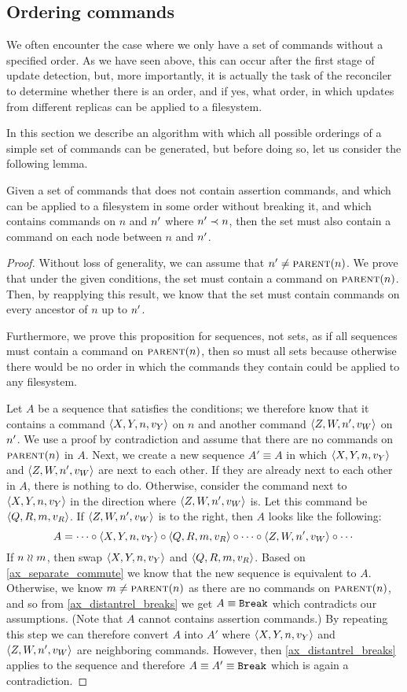 
\subsection{Ordering commands}\label{ordering}

We often encounter the case where we only have a set of commands without a specified order.
As we have seen above, this can occur after the first stage of update detection,
but, more importantly,
it is actually the task of the reconciler to determine whether there is an order,
and if yes, what order,
in which updates from different replicas can be applied to a filesystem.

In this section we describe an algorithm with which all possible orderings of a
simple set of commands can be generated, but before doing so, let us consider the following lemma.

\begin{mylem}\label{connected_changes}
Given a set of commands that
does not contain assertion commands,
and which can be applied to a filesystem in some order without breaking it,
and which contains commands on $n$ and $n'$ where $n'\prec n$,
then the set must also contain a command
on each node between $n$ and $n'$.
\end{mylem}
\begin{proof}
Without loss of generality, we can assume that $n'\neq\text{\normalfont\scshape{parent}}(n)$.
We prove that under the given conditions, the set must contain a command on $\text{\normalfont\scshape{parent}}(n)$.
Then, by reapplying this result, we know that the set must contain commands on every
ancestor of $n$ up to $n'$.

Furthermore,
we prove this proposition for sequences, not sets, as if all sequences must contain a command on $\text{\normalfont\scshape{parent}}(n)$,
then so must all sets because otherwise there would be no order in which the commands they contain could be
applied to any filesystem.

Let $A$ be a sequence that satisfies the conditions;
we therefore know that it contains a command $\langle{X,Y,n,v_Y}\rangle$ on $n$
and another command $\langle{Z,W,n',v_W}\rangle$ on $n'$.
We use a proof by contradiction and assume that there are no commands on $\text{\normalfont\scshape{parent}}(n)$ in $A$.
Next, we create a new sequence $A'\equiv A$ in which $\langle{X,Y,n,v_Y}\rangle$ and $\langle{Z,W,n',v_W}\rangle$ are next to each other.
If they are already next to each other in $A$, there is nothing to do.
Otherwise, consider the command next to $\langle{X,Y,n,v_Y}\rangle$ in the direction where $\langle{Z,W,n',v_W}\rangle$ is.
Let this command be $\langle{Q,R,m,v_R}\rangle$.
If $\langle{Z,W,n',v_W}\rangle$ is to the right, then $A$ looks like the following:
\[ A = \cdots\circ\langle{X,Y,n,v_Y}\rangle\circ\langle{Q,R,m,v_R}\rangle\circ\cdots\circ\langle{Z,W,n',v_W}\rangle\circ\cdots \]
If $n\mathrel{\wr\wr} m$, then swap $\langle{X,Y,n,v_Y}\rangle$ and $\langle{Q,R,m,v_R}\rangle$. Based on \cref{ax_separate_commute} we know that the new
sequence is equivalent to $A$.
Otherwise, we know $m\neq\text{\normalfont\scshape{parent}}(n)$ as there are no commands on $\text{\normalfont\scshape{parent}}(n)$, and so
from \cref{ax_distantrel_breaks} we get $A\equiv\mathtt{Break}$ which contradicts our assumptions.
(Note that $A$ cannot contains assertion commands.)
By repeating this step we can therefore convert $A$ into $A'$ where $\langle{X,Y,n,v_Y}\rangle$ and $\langle{Z,W,n',v_W}\rangle$ are neighboring commands.
However, then \cref{ax_distantrel_breaks} applies to the sequence and therefore $A\equiv A'\equiv\mathtt{Break}$ which
is again a contradiction.
\end{proof}

